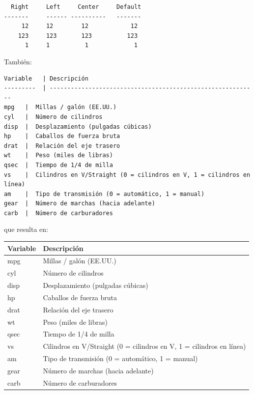 \documentclass[
]{book}
\newcounter{none} %
\theoremstyle{break}
\theoremstyle{nonumberplain}
\begin{document}
\begin{verbatim}
  Right     Left     Center     Default
-------     ------ ----------   -------
     12     12        12            12
    123     123       123          123
      1     1          1             1   
\end{verbatim}

También:

\begin{verbatim}
Variable   | Descripción
---------  | -----------------------------------------------------------
mpg   |  Millas / galón (EE.UU.) 
cyl   |  Número de cilindros
disp  |  Desplazamiento (pulgadas cúbicas)
hp    |  Caballos de fuerza bruta
drat  |  Relación del eje trasero
wt    |  Peso (miles de libras)
qsec  |  Tiempo de 1/4 de milla
vs    |  Cilindros en V/Straight (0 = cilindros en V, 1 = cilindros en línea)
am    |  Tipo de transmisión (0 = automático, 1 = manual)
gear  |  Número de marchas (hacia adelante)
carb  |  Número de carburadores 
\end{verbatim}

que resulta en:

{\def\LTcaptype{none} %
\begin{longtable}[]{@{}
  >{\raggedright\arraybackslash}p{}
  >{\raggedright\arraybackslash}p{}@{}}
\toprule\noalign{}
\begin{minipage}[b]{\linewidth}\raggedright
Variable
\end{minipage} & \begin{minipage}[b]{\linewidth}\raggedright
Descripción
\end{minipage} \\
\midrule\noalign{}
\endhead
\bottomrule\noalign{}
\endlastfoot
mpg & Millas / galón (EE.UU.) \\
cyl & Número de cilindros \\
disp & Desplazamiento (pulgadas cúbicas) \\
hp & Caballos de fuerza bruta \\
drat & Relación del eje trasero \\
wt & Peso (miles de libras) \\
qsec & Tiempo de 1/4 de milla \\
vs & Cilindros en V/Straight (0 = cilindros en V, 1 = cilindros en línea) \\
am & Tipo de transmisión (0 = automático, 1 = manual) \\
gear & Número de marchas (hacia adelante) \\
carb & Número de carburadores \\
\end{longtable}
}
\end{document}

